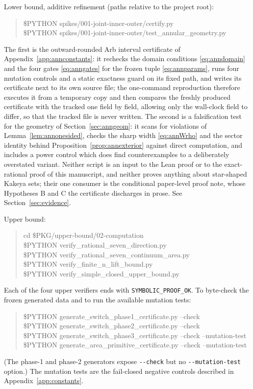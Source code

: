 \documentclass[11pt]{article}
\theoremstyle{plain}
\theoremstyle{definition}
\theoremstyle{remark}
\begin{document}
Lower bound, additive refinement (paths relative to the project root):
\begin{quote}\small\ttfamily
\$PYTHON spikes/001-joint-inner-outer/certify.py\\
\$PYTHON spikes/001-joint-inner-outer/test\_annular\_geometry.py
\end{quote}
The first is the outward-rounded Arb interval certificate of
Appendix~\ref{app:annconstants}: it rechecks the domain conditions
\eqref{eq:anndomain} and the four gates \eqref{eq:anngates} for the frozen tuple
\eqref{eq:annparams}, runs four mutation controls and a static exactness guard
on its fixed path, and writes its certificate next to its own source file; the
one-command reproduction therefore executes it from a temporary copy and then
compares the freshly produced certificate with the tracked one field by field,
allowing only the wall-clock field to differ, so that the tracked file is never
written. The second is a falsification test for the geometry of
Section~\ref{sec:anngeom}: it scans for violations of
Lemma~\ref{lem:annonesided}, checks the sharp width \eqref{eq:annWrho} and the
sector identity behind Proposition~\ref{prop:annexterior} against direct
computation, and includes a power control which does find counterexamples to a
deliberately overstated variant. Neither script is an input to the Lean proof or
to the exact-rational proof of this manuscript, and neither proves anything
about star-shaped Kakeya sets; their one consumer is the conditional
paper-level proof note, whose Hypotheses B and C the certificate discharges in
prose. See Section~\ref{sec:evidence}.

Upper bound:
\begin{quote}\small\ttfamily
cd \$PKG/upper-bound/02-computation\\
\$PYTHON verify\_rational\_seven\_direction.py\\
\$PYTHON verify\_rational\_seven\_continuum\_area.py\\
\$PYTHON verify\_finite\_n\_lift\_bound.py\\
\$PYTHON verify\_simple\_closed\_upper\_bound.py
\end{quote}
Each of the four upper verifiers ends with \verb|SYMBOLIC_PROOF_OK|. To
byte-check the frozen generated data and to run the available mutation tests:
\begin{quote}\small\ttfamily
\$PYTHON generate\_switch\_phase1\_certificate.py --check\\
\$PYTHON generate\_switch\_phase2\_certificate.py --check\\
\$PYTHON generate\_switch\_phase3\_certificate.py --check --mutation-test\\
\$PYTHON generate\_area\_primitive\_certificate.py --check --mutation-test
\end{quote}
(The phase-1 and phase-2 generators expose \verb|--check| but no
\verb|--mutation-test| option.) The mutation tests are the fail-closed negative
controls described in Appendix~\ref{app:constants}.
\end{document}
